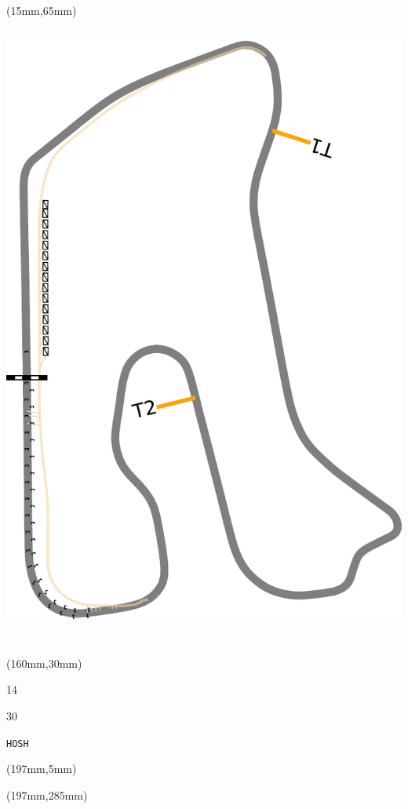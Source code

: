 \begin{textblock*}{185mm}(15mm,65mm)%
\centering
\mbox{\includegraphics[width=185mm,height=210mm,keepaspectratio]{PT/HOSH.pdf}}
\end{textblock*}
\begin{textblock*}{40mm}(160mm,30mm)%
\Large
\par{} 
\par14 
\par30 
\par\hfill\tiny\tt HOSH\\
\end{textblock*}
\begin{textblock*}{20mm}(197mm,5mm)%
\fbox{\thepage}
\label{HOSH}
\end{textblock*}
\begin{textblock*}{20mm}(197mm,285mm)%
\fbox{\thepage}
\end{textblock*}

